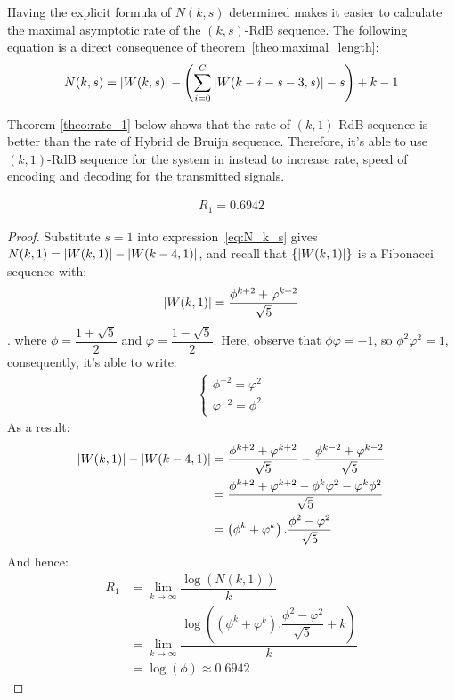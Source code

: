 Having the explicit formula of $N(k,s)$ determined makes it easier to calculate the maximal asymptotic rate of the $(k,s)$-RdB sequence. The following equation is a direct consequence of theorem~\ref{theo:maximal_length}:
\begin{align}
    N(k,s) = \left \lvert  W(k,s) \right \rvert - \left(\sum_{i=0}^{C}\left \lvert  W(k-i-s-3,s) \right \rvert - s\right) + k - 1\label{eq:N_k_s}
\end{align}


Theorem \ref{theo:rate_1} below shows that the rate of $(k,1)$-RdB sequence is better than the rate of Hybrid de Bruijn sequence. Therefore, it's able to use $(k,1)$-RdB sequence for the system in \cite{zhang2021timing} instead to increase rate, speed of encoding and decoding for the transmitted signals.

\begin{theorem}\label{theo:rate_1}
    \begin{align}
        R_{1} = 0.6942
    \end{align}
\end{theorem}
\begin{proof}
    Substitute $s=1$ into expression~\ref{eq:N_k_s} gives $N(k,1) = \left \lvert W(k,1) \right \rvert - \left \lvert W(k-4,1) \right \rvert$, and recall that $\{\left \lvert W(k,1) \right \rvert\}$ is a Fibonacci sequence with: 
    \[\left \lvert W(k,1) \right \rvert = \dfrac{\phi^{k+2}+\varphi^{k+2}}{\sqrt{5}}\].
    where $\phi = \dfrac{1+\sqrt{5}}{2}$ and $\varphi = \dfrac{1-\sqrt{5}}{2}$. Here, observe that $\phi\varphi=-1$, so $\phi^{2}\varphi^{2}=1$, consequently, it's able to write:
    \begin{align*}
        \left\{\begin{matrix}
            \phi^{-2} = \varphi^{2} \\
            \varphi^{-2} = \phi^{2}
        \end{matrix}\right.
    \end{align*}
    As a result: 
    \begin{align*}
        \left \lvert W(k,1) \right \rvert - \left \lvert W(k-4,1) \right \rvert &= \dfrac{\phi^{k+2}+\varphi^{k+2}}{\sqrt{5}} - \dfrac{\phi^{k-2}+\varphi^{k-2}}{\sqrt{5}}\\
        &= \dfrac{\phi^{k+2}+\varphi^{k+2}-\phi^{k}\varphi^{2}-\varphi^{k}\phi^{2}}{\sqrt{5}}\\
        &= \left(\phi^{k}+\varphi^{k}\right).\dfrac{\phi^{2}-\varphi^{2}}{\sqrt{5}}
    \end{align*}
    And hence:
    \begin{align*}
        R_{1} &= \lim_{k\to\infty}\dfrac{\log(N(k,1))}{k} \\
        &= \lim_{k\to\infty}\dfrac{ \log\left( \left(\phi^{k}+\varphi^{k}\right).\dfrac{\phi^{2}-\varphi^{2}}{\sqrt{5}}+k \right) }{k} \\
        &= \log(\phi) \approx 0.6942
    \end{align*}
\end{proof}

